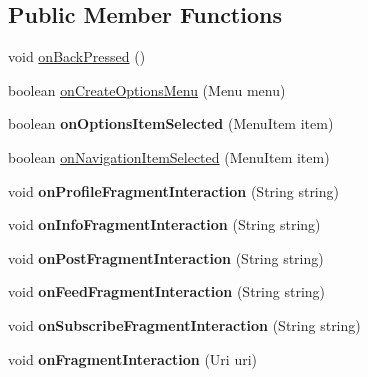 \subsection*{Public Member Functions}
\begin{DoxyCompactItemize}
\item 
void \hyperlink{classcom_1_1example_1_1sel_1_1lostfound_1_1FeedActivity_a92ef1347dacbec013be0cc6eaf19e680}{on\+Back\+Pressed} ()
\item 
boolean \hyperlink{classcom_1_1example_1_1sel_1_1lostfound_1_1FeedActivity_a11b2b6ec46e07d2248259b101dd4f699}{on\+Create\+Options\+Menu} (Menu menu)
\item 
boolean {\bfseries on\+Options\+Item\+Selected} (Menu\+Item item)\hypertarget{classcom_1_1example_1_1sel_1_1lostfound_1_1FeedActivity_a30ac1d8cd6a1f8f4a17546f894ee0150}{}\label{classcom_1_1example_1_1sel_1_1lostfound_1_1FeedActivity_a30ac1d8cd6a1f8f4a17546f894ee0150}

\item 
boolean \hyperlink{classcom_1_1example_1_1sel_1_1lostfound_1_1FeedActivity_ac1e5f59e54f8b0adfcfcd7999c7d5d3d}{on\+Navigation\+Item\+Selected} (Menu\+Item item)
\item 
void {\bfseries on\+Profile\+Fragment\+Interaction} (String string)\hypertarget{classcom_1_1example_1_1sel_1_1lostfound_1_1FeedActivity_a7dab67bae2a8451acea819995f6e10b8}{}\label{classcom_1_1example_1_1sel_1_1lostfound_1_1FeedActivity_a7dab67bae2a8451acea819995f6e10b8}

\item 
void {\bfseries on\+Info\+Fragment\+Interaction} (String string)\hypertarget{classcom_1_1example_1_1sel_1_1lostfound_1_1FeedActivity_a4d16fc6e0aa78d30aa10142e5e2584ac}{}\label{classcom_1_1example_1_1sel_1_1lostfound_1_1FeedActivity_a4d16fc6e0aa78d30aa10142e5e2584ac}

\item 
void {\bfseries on\+Post\+Fragment\+Interaction} (String string)\hypertarget{classcom_1_1example_1_1sel_1_1lostfound_1_1FeedActivity_a93cd51363a21d0dd0368eca17f91aa31}{}\label{classcom_1_1example_1_1sel_1_1lostfound_1_1FeedActivity_a93cd51363a21d0dd0368eca17f91aa31}

\item 
void {\bfseries on\+Feed\+Fragment\+Interaction} (String string)\hypertarget{classcom_1_1example_1_1sel_1_1lostfound_1_1FeedActivity_a387420f45593f43ed8a998fabd4e1840}{}\label{classcom_1_1example_1_1sel_1_1lostfound_1_1FeedActivity_a387420f45593f43ed8a998fabd4e1840}

\item 
void {\bfseries on\+Subscribe\+Fragment\+Interaction} (String string)\hypertarget{classcom_1_1example_1_1sel_1_1lostfound_1_1FeedActivity_a2933085fa5342bd11b601c37120d850e}{}\label{classcom_1_1example_1_1sel_1_1lostfound_1_1FeedActivity_a2933085fa5342bd11b601c37120d850e}

\item 
void {\bfseries on\+Fragment\+Interaction} (Uri uri)\hypertarget{classcom_1_1example_1_1sel_1_1lostfound_1_1FeedActivity_a15280442a0b2314b06299d1d57318827}{}\label{classcom_1_1example_1_1sel_1_1lostfound_1_1FeedActivity_a15280442a0b2314b06299d1d57318827}

\end{DoxyCompactItemize}
